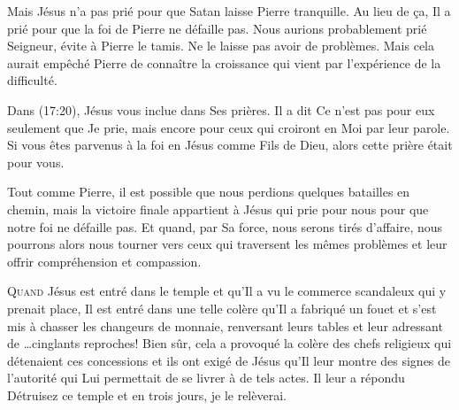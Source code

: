 Mais Jésus n'a pas prié pour que Satan laisse Pierre tranquille.
 Au lieu de \c{c}a, Il a prié pour que la foi de Pierre ne défaille pas.
 Nous aurions probablement prié\frcolon{} \Og Seigneur, évite à Pierre le tamis.
 Ne le laisse pas avoir de problèmes. \Fg{}
 Mais cela aurait empêché Pierre de connaître la croissance qui vient
 par l'expérience de la difficulté.


Dans (17:20), Jésus vous inclue dans Ses prières.
 Il a dit\frcolon{} 
 \Og Ce n'est pas pour eux seulement que Je prie, mais encore pour ceux
 qui croiront en Moi par leur parole. \Fg{}
 Si vous êtes parvenus à la foi en Jésus comme Fils de Dieu,
 alors cette prière était pour vous.

Tout comme Pierre, il est possible que nous perdions quelques batailles
 en chemin, mais la victoire  finale appartient à Jésus
 qui prie pour nous pour que notre foi ne défaille pas.
 Et quand, par Sa force, nous serons tirés d'affaire,
 nous pourrons alors nous tourner vers ceux qui traversent
 les mêmes problèmes et leur offrir compréhension et compassion.

\dvrule






\lettrine{Q}{uand} Jésus est entré dans le temple et qu'Il a vu le commerce
 scandaleux qui y prenait place, Il est entré dans une telle colère
 qu'Il a fabriqué un fouet et s'est mis à chasser les changeurs
 de monnaie, renversant leurs tables et leur adressant
 de \dots cinglants reproches!
 Bien sûr, cela a provoqué la colère des chefs religieux
 qui détenaient ces concessions et ils ont exigé de Jésus
 qu'Il leur montre des signes de l'autorité qui Lui permettait
 de se livrer à de tels actes.
 Il leur a répondu\frcolon{} 
 \Og Détruisez ce temple et en trois jours, je le relèverai. \Fg{}

